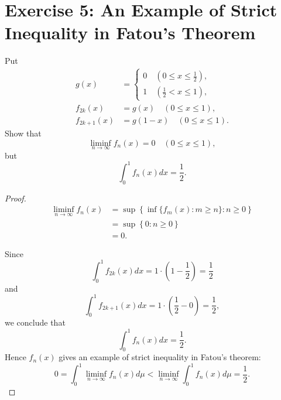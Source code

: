 \documentclass{amsbook}
\theoremstyle{definition}
\theoremstyle{remark}
\numberwithin{section}{chapter}
\numberwithin{equation}{chapter}
\begin{document}
\section{Exercise 5: An Example of Strict Inequality in Fatou's Theorem}
Put\[
\begin{split}
g(x)&=\begin{cases}
0\quad(0\leqslant x\leqslant\frac{1}{2}),\\
1\quad(\frac{1}{2}<x\leqslant1),
\end{cases}\\
f_{2k}(x)&=g(x)\quad(0\leqslant x\leqslant1),\\
f_{2k+1}(x)&=g(1-x)\quad(0\leqslant x\leqslant1).
\end{split}
\]Show that\[
\liminf_{n\to\infty}f_n(x)=0\quad(0\leqslant x\leqslant1),
\]but\[
\int_0^1 f_n(x)dx=\frac{1}{2}.
\]
\begin{proof}
\[
\begin{split}
\liminf_{n\to\infty}f_n(x)&=\sup\left\{\inf\{f_m(x):m\geqslant n\}:n\geqslant0\right\}\\
&=\sup\left\{0:n\geqslant0\right\}\\
&=0.
\end{split}
\]

Since\[
\int_0^1 f_{2k}(x)dx=1\cdot\left(1-\frac{1}{2}\right)=\frac{1}{2}
\]and\[
\int_0^1 f_{2k+1}(x)dx=1\cdot\left(\frac{1}{2}-0\right)=\frac{1}{2},
\]we conclude that\[
\int_0^1 f_n(x)dx=\frac{1}{2}.
\]Hence $f_n(x)$ gives an example of strict inequality in Fatou's theorem:\[
0=\int_0^1\liminf_{n\to\infty}f_n(x)d\mu<\liminf_{n\to\infty}\int_0^1f_n(x)d\mu=\frac{1}{2}.
\]
\end{proof}



\backmatter


\end{document}
